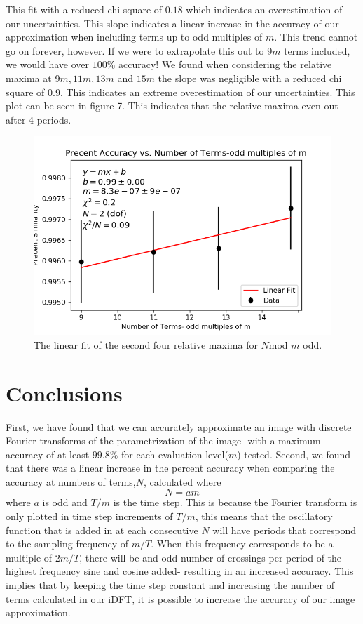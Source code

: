 \documentclass[psamsfonts]{amsart}
\theoremstyle{definition}
\theoremstyle{remark}
\numberwithin{equation}{section}
\begin{document}
 
  This fit with a reduced chi square of $0.18$ which indicates an overestimation of our uncertainties. This slope indicates a linear increase in the accuracy of our approximation when including terms up to odd  multiples of $m$. This trend cannot go on forever, however. If we were to extrapolate this out to $9m$ terms included, we would have over $100\%$ accuracy! We found when considering the relative maxima at $9m, 11m, 13m$ and $15m$  the slope was negligible with a reduced chi square of $0.9$.  This indicates an extreme overestimation of our uncertainties. This plot can be seen in figure 7. This indicates that the relative maxima even out after 4 periods. 
  
  \begin{figure}[h!]
  	\centering
  	\includegraphics[scale=.4]{girl_250_nextfour.png}
  	\caption{The linear fit of the second four relative maxima for $N$mod $m$ odd.}
  \end{figure}
  

\section{Conclusions}
First, we have found that we can accurately approximate an image with discrete Fourier transforms of the parametrization of the image- with a maximum accuracy of at least $99.8\%$ for each evaluation level($m$) tested. Second, we found that there was a linear increase in the percent accuracy when comparing the accuracy at numbers of terms,$N$, calculated where $$N= am$$ where $a$ is odd and $T/m$ is the time step. This is because the Fourier transform is only plotted in time step increments of $T/m$, this means that the oscillatory function that is added in at each consecutive $N$ will have periods that correspond to the sampling frequency of $m/T$. When this frequency corresponds to be a multiple of $2m/T$, there will be and odd number of crossings per period of the highest frequency sine and cosine added- resulting in an increased accuracy. This implies that by keeping the time step constant and increasing the number of terms calculated in our iDFT, it is possible to increase the accuracy of our image approximation. 
\end{document}
